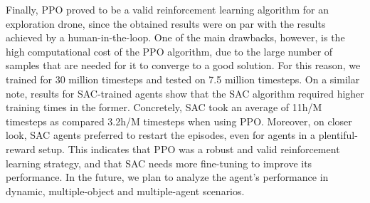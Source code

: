     
    Finally, PPO proved to be a valid reinforcement learning algorithm for an exploration drone, since the obtained results were on par with the results achieved by a human-in-the-loop.
        One of the main drawbacks, however, is the high computational cost of the PPO algorithm, due to the large number of samples that are needed for it to converge to a good solution. 
        For this reason, we trained for 30 million timesteps and tested on 7.5 million timesteps. 
        On a similar note, results for SAC-trained agents show that the SAC algorithm required higher training times in the former. Concretely, SAC took an average of 11h/M timesteps as compared  3.2h/M timesteps when using PPO. Moreover, on closer look, SAC agents preferred to restart the episodes, even for agents in a plentiful-reward setup. This indicates that PPO was a robust and valid reinforcement learning strategy, and that SAC needs more fine-tuning to improve its performance. In the future, we plan to analyze the agent's performance in dynamic, multiple-object and multiple-agent scenarios.
        
    



    
    
    
